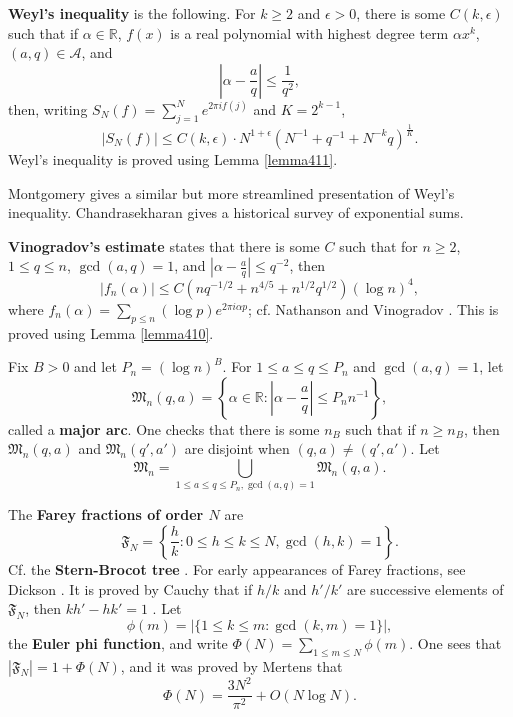 \documentclass{article}
\begin{document}
\textbf{Weyl's inequality} \cite[p.~114, Theorem 4.3]{nathanson} is the following.
For $k \geq 2$ and $\epsilon>0$, there is some $C(k,\epsilon)$ such that if
$\alpha \in \mathbb{R}$, $f(x)$ is a real polynomial with highest degree term $\alpha x^k$, 
$(a,q) \in \mathscr{A}$, and
\[
\left|\alpha-\frac{a}{q}\right| \leq \frac{1}{q^2},
\]
then, writing $S_N(f)=\sum_{j=1}^N e^{2\pi i f(j)}$ and $K=2^{k-1}$,
\[
|S_N(f)| \leq C(k,\epsilon) \cdot N^{1+\epsilon}(N^{-1}+q^{-1}+N^{-k}q)^{\frac{1}{K}}.
\]
Weyl's inequality is proved using Lemma \ref{lemma411}.

Montgomery \cite[Chapter 3]{montgomery} gives a similar but more streamlined presentation of Weyl's inequality.
Chandrasekharan \cite{MR0369277} gives a historical survey of exponential sums.

\textbf{Vinogradov's estimate}  \cite[p.~26, Theorem 3.1]{vaughan}  states that
there is some $C$ such that for $n \geq 2$, $1 \leq q \leq n$, $\gcd(a,q)=1$, and $\left|\alpha - \frac{a}{q}\right| \leq q^{-2}$, then
\begin{equation}
|f_n(\alpha)| \leq C (nq^{-1/2} + n^{4/5} + n^{1/2} q^{1/2}) (\log n)^4,
\label{vinogradov}
\end{equation}
where  $f_n(\alpha) = \sum_{p \leq n} (\log p)e^{2\pi i\alpha p}$;
cf. Nathanson \cite[p.~220, Theorem 8.5]{nathanson} and Vinogradov \cite[p.~131, Chapter IX, Theorem 1]{vinogradov}.
This is proved using Lemma \ref{lemma410}.


Fix $B>0$ and let $P_n = (\log n)^B$. For $1 \leq a \leq q \leq P_n$ and $\gcd(a,q)=1$, let
\[
\mathfrak{M}_n(q,a) = \left\{ \alpha \in \mathbb{R} : \left|\alpha - \frac{a}{q} \right| \leq P_n n^{-1} \right\},
\]
called a \textbf{major arc}. One checks that there is some $n_B$ such that if $n \geq n_B$, then
$\mathfrak{M}_n(q,a)$ and $\mathfrak{M}_n(q',a')$ are disjoint when $(q,a) \neq (q',a')$. 
Let
\[
\mathfrak{M}_n = \bigcup_{1 \leq a \leq q \leq P_n, \gcd(a,q)=1} \mathfrak{M}_n(q,a).
\]

The \textbf{Farey fractions of order $N$} are
\[
\mathfrak{F}_N = \left\{ \frac{h}{k} : 0 \leq h \leq k \leq N, \gcd(h,k)=1\right\}.
\]
Cf. the \textbf{Stern-Brocot tree} \cite[\S 4.5]{concrete}.
For early appearances of  Farey
fractions, see Dickson \cite[pp.~155--158, Chapter V]{dicksonI}.
It is proved by Cauchy that if $h/k$ and $h'/k'$ are successive elements of $\mathfrak{F}_N$, then
$kh'-hk'=1$ \cite[p.~23, Theorem 28]{wright}.
Let
\[
\phi(m) = |\{1 \leq k \leq m: \gcd(k,m)=1\}|,
\]
the \textbf{Euler phi function}, and write $\Phi(N) = \sum_{1 \leq m \leq N} \phi(m)$. 
One sees that 
$|\mathfrak{F}_N| = 1+\Phi(N)$, and
 it was proved by Mertens  \cite[p.~268]{wright} that
\[
\Phi(N) = \frac{3N^2}{\pi^2} + O(N\log N).
\]
\end{document}
